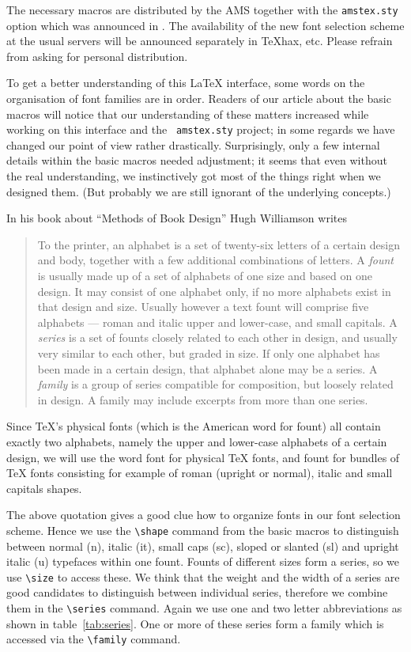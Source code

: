  The necessary macros are distributed by the AMS together with the
 {\tt amstex.sty} option which was announced in .
 The availability of the new font selection scheme at the usual
 servers will be announced separately in \TeX{}hax, etc. Please
 refrain from asking for personal distribution.

 To get a better understanding of this \LaTeX{} interface, some words on
 the organisation of font families are in order.  Readers of our
 article about the basic macros will notice that our understanding of
 these matters increased while working on this interface and the {\tt
 amstex.sty} project; in some regards we have changed our point of view
 rather drastically.
 Surprisingly, only a few internal details within the basic
 macros needed adjustment; it seems that even without the real
 understanding, we
 instinctively got most of the things right when we designed them.  (But
 probably we  are still ignorant of the underlying concepts.)

 In his book about ``Methods of Book Design'' Hugh Williamson writes
 \cite{Williamson}
 \begin{quote}
   \missing
   To the printer, an alphabet is a set of twenty-six letters of a
   certain design and body, together with a few additional
   combinations of letters. A {\em fount\/} is usually made up of a
   set of alphabets of one size and based on one design. It may
   consist of one alphabet only, if no more alphabets exist in that
   design and size.  Usually however a text fount will comprise five
   alphabets --- roman and italic upper and lower-case, and small
   capitals.
   \missing
   A {\em series\/} is a set of founts closely related to each other
   in design, and usually very similar to each other, but graded in
   size.  If only one alphabet has been made in a certain design, that
   alphabet alone may be a series.  A {\em family\/} is a group of
   series compatible for composition, but loosely related in design.  A
   family may include excerpts from more than one series.
 \end{quote}

 Since \TeX{}'s physical fonts (which is the American word for
 fount) all contain exactly two alphabets, namely the upper and
 lower-case alphabets of a certain design, we will use the word font
 for physical \TeX{} fonts, and fount for bundles of \TeX{} fonts
 consisting for example of roman (upright or normal), italic and small
 capitals shapes.

 The above quotation gives a good clue how to organize fonts in our
 font selection scheme.  Hence we use the \verb+\shape+ command from
 the basic macros to distinguish between normal (n), italic (it),
 small caps (sc), sloped or slanted (sl) and upright italic (u)
 typefaces within one fount.  Founts of different sizes form a series,
 so we use \verb+\size+ to access these.  We think that the weight and
 the width of a series are good candidates to distinguish between
 individual series, therefore we combine them in the \verb+\series+
 command.  Again we use one and two letter abbreviations as shown in
 table~\ref{tab:series}.  One or more of these series form a family
 which is accessed via the \verb+\family+ command.

